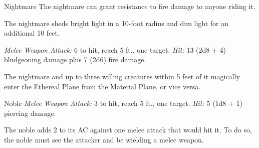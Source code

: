 \documentclass[10pt,a4paper,twoside,bg=print,twocolumn,openany,nodeprecatedcode]{dndbook}
\begin{document}
\begin{DndMonster}[float=t]{Nightmare}
\DndMonsterBasics[
armor-class = {13 (natural armor)},
hit-points = {\DndDice{8d10 + 24}},
speed = {60 ft., fly 90 ft.}
]
\DndMonsterAbilityScores[
 str = 18,
 dex = 15,
 con = 16,
 int = 10,
 wis = 13,
 cha = 15
]
\DndMonsterDetails[
damage-immunities = {fire},
languages = {understands Abyssal, Common, and Infernal but can't speak },
challenge = 3,
]
The nightmare can grant resistance to fire damage to anyone riding it.

The nightmare sheds bright light in a 10-foot radius and dim light for an additional 10 feet.

\textsl{Melee Weapon Attack:} 6 to hit, reach 5 ft., one target. \textsl{Hit:} 13 (2d8 + 4) bludgeoning damage plus 7 (2d6) fire damage.

The nightmare and up to three willing creatures within 5 feet of it magically enter the Ethereal Plane from the Material Plane, or vice versa.

\end{DndMonster}



\begin{DndMonster}[float=t]{Noble}
\DndMonsterBasics[
armor-class = {15 (\textit{breastplate})},
hit-points = {\DndDice{2d8}},
speed = {30 ft.}
]
\DndMonsterAbilityScores[
 str = 11,
 dex = 12,
 con = 11,
 int = 12,
 wis = 14,
 cha = 16
]
\DndMonsterDetails[
skills = {Deception +5, Insight +4, Persuasion +5},
languages = {any two languages},
challenge = 1/8,
]
\textsl{Melee Weapon Attack:} 3 to hit, reach 5 ft., one target. \textsl{Hit:} 5 (1d8 + 1) piercing damage.

The noble adds 2 to its AC against one melee attack that would hit it. To do so, the noble must see the attacker and be wielding a melee weapon.

\end{DndMonster}
\end{document}
